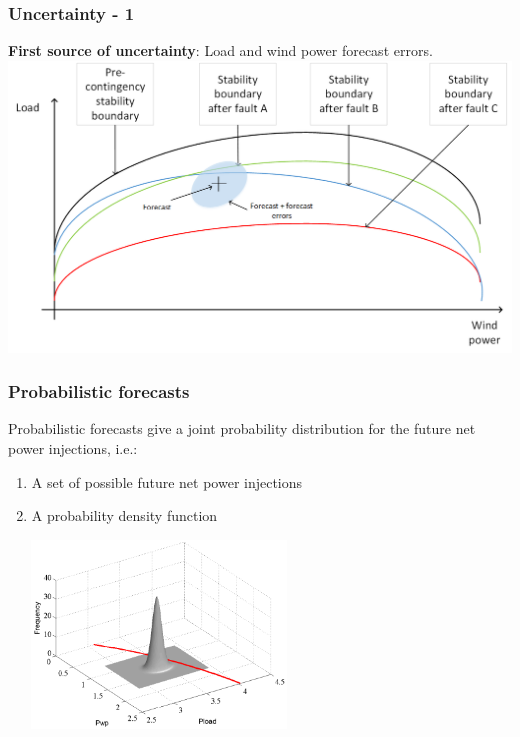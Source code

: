 \documentclass{beamer}
\begin{document}
\begin{frame}
  \frametitle{Uncertainty - 1}
\textbf{First source of uncertainty}: Load and wind power forecast errors.
\vskip0.4cm
\includegraphics[width=\textwidth]{Figs/StabBound-with-prob-forecast.png}
\end{frame}

\begin{frame}
  \frametitle{Probabilistic forecasts}
Probabilistic forecasts give a joint probability distribution for the future net power injections, i.e.:
\begin{enumerate}
\item A set of possible future net power injections
\item A probability density function
\end{enumerate} \includegraphics[height=5cm,width=0.6\textwidth]{Figs/KarysStbBdAndForcast3D-1}
\end{frame}
\end{document}
